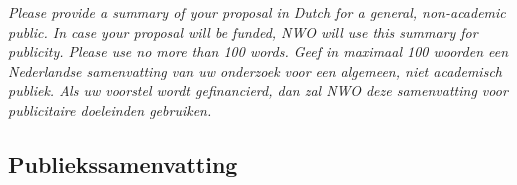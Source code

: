 \noindent{}

\textit{Please provide a summary of your proposal in Dutch for a general, non-academic public. In case your proposal will be funded, NWO will use this summary for publicity. Please use no more than 100 words.
Geef in maximaal 100 woorden een Nederlandse samenvatting van uw onderzoek voor een algemeen, niet academisch publiek. Als uw voorstel wordt gefinancierd, dan zal NWO deze samenvatting voor publicitaire doeleinden gebruiken.}

\subsection{Publiekssamenvatting}